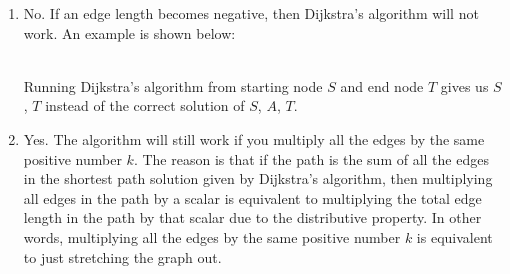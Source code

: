 \documentclass[11pt]{article}
\begin{document}
\begin{enumerate}[label=(\alph*)]
\item
No. If an edge length becomes negative, then Dijkstra’s algorithm will not work. An example is shown below:
\\
\\
Running Dijkstra's algorithm from starting node $S$ and end node $T$ gives us $S$, $T$ instead of the correct solution of $S$, $A$, $T$.

\item
Yes. The algorithm will still work if you multiply all the edges by the same positive number $k$. The reason is that if the path is the sum of all the edges in the shortest path solution given by Dijkstra's algorithm, then multiplying all edges in the path by a scalar is equivalent to multiplying the total edge length in the path by that scalar due to the distributive property. In other words, multiplying all the edges by the same positive number $k$ is equivalent to just stretching the graph out.
\end{enumerate}



\newpage
\end{document}

